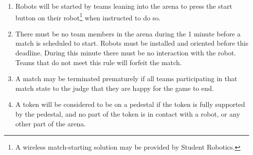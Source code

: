 \begin{enumerate}
      Each match in the knockout competition involves up to 4 teams.
      The teams that come 1\textsuperscript{st} and 2\textsuperscript{nd} in each knockout match will continue to the next round of the knockout.
      In the event of a tie in a knockout match, the team that ranked highest in the league will go through.
      If there is a tie in the final, then a rematch will be played.
      The number of league and knockout matches will be announced on the morning of the competition.

\item Robots will be started by teams leaning into the arena to press the start button on their robot\footnote{A wireless match-starting solution may be provided by Student Robotics.} when instructed to do so.

\item There must be no team members in the arena during the 1 minute before a match is scheduled to start.
      Robots must be installed and oriented before this deadline.
      During this minute there must be no interaction with the robot.
      Teams that do not meet this rule will forfeit the match.

\item A match may be terminated prematurely if all teams participating in that match state to the judge that they are happy for the game to end.

\item A token will be considered to be on a pedestal if the token is fully supported by the pedestal, and no part of the token is in contact with a robot, or any other part of the arena.

\end{enumerate}

